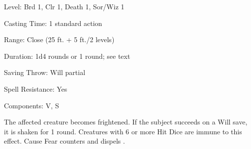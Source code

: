 
\begin{description*}
\item[Level:] Brd 1, Clr 1, Death 1, Sor/Wiz 1
\item[Casting Time:] 1 standard action
\item[Range:] Close (25 ft. + 5 ft./2 levels)
\item[Duration:] 1d4 rounds or 1 round; see text
\item[Saving Throw:] Will partial
\item[Spell Resistance:] Yes
\item[Components:] V, S
\end{description*}

The affected creature becomes frightened. If the subject succeeds on a Will save,
it is shaken for 1 round. Creatures with 6 or more Hit Dice are immune to this
effect.
Cause Fear counters and dispels .